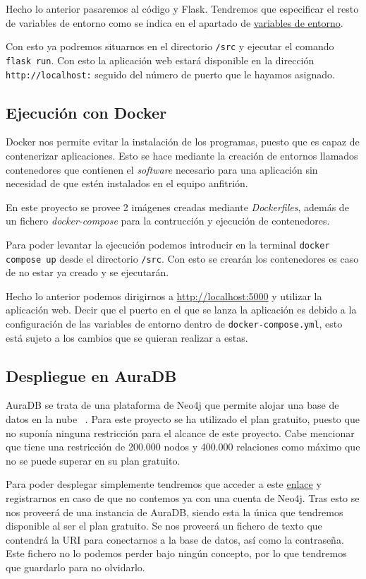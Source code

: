 Hecho lo anterior pasaremos al código y Flask. Tendremos que especificar el resto de variables de entorno como se indica en el apartado de \hyperref[sec:venv]{variables de entorno}.

Con esto ya podremos situarnos en el directorio \texttt{/src} y ejecutar el comando \texttt{flask run}. Con esto la aplicación web estará disponible en la dirección \texttt{http://localhost:} seguido del número de puerto que le hayamos asignado.
\subsection{Ejecución con Docker}
Docker nos permite evitar la instalación de los programas, puesto que es capaz de contenerizar aplicaciones. Esto se hace mediante la creación de entornos llamados contenedores que contienen el \textit{software} necesario para una aplicación sin necesidad de que estén instalados en el equipo anfitrión.

En este proyecto se provee 2 imágenes creadas mediante \textit{Dockerfiles}, además de un fichero \textit{docker-compose} para la contrucción y ejecución de contenedores.

Para poder levantar la ejecución podemos introducir en la terminal \texttt{docker compose up} desde el directorio \texttt{/src}. Con esto se crearán los contenedores es caso de no estar ya creado y se ejecutarán.

Hecho lo anterior podemos dirigirnos a \url{http://localhost:5000} y utilizar la aplicación web. Decir que el puerto en el que se lanza la aplicación es debido a la configuración de las variables de entorno dentro de \texttt{docker-compose.yml}, esto está sujeto a los cambios que se quieran realizar a estas.


\subsection{Despliegue en AuraDB}

AuraDB se trata de una plataforma de Neo4j que permite alojar una base de datos en la nube ~\cite{neo4jNeo4jAura}. Para este proyecto se ha utilizado el plan gratuito, puesto que no suponía ninguna restricción para el alcance de este proyecto. Cabe mencionar que tiene una restricción de 200.000 nodos y 400.000 relaciones como máximo que no se puede superar en su plan gratuito.

Para poder desplegar simplemente tendremos que acceder a este \href{https://neo4j.com/cloud/platform/aura-graph-database/?ref=neo4j-home-hero}{enlace} y registrarnos en caso de que no contemos ya con una cuenta de Neo4j. Tras esto se nos proveerá de una instancia de AuraDB, siendo esta la única que tendremos disponible al ser el plan gratuito. Se nos proveerá un fichero de texto que contendrá la URI para conectarnos a la base de datos, así como la contraseña. Este fichero no lo podemos perder bajo ningún concepto, por lo que tendremos que guardarlo para no olvidarlo.

